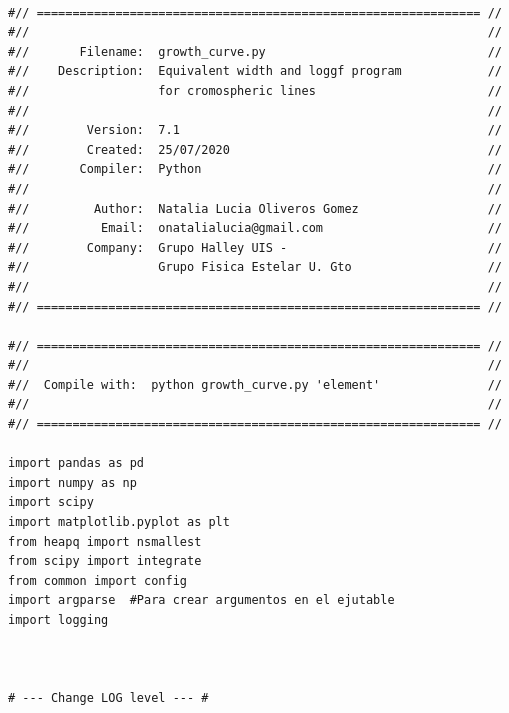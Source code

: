 \documentclass[12pt,oneside,openany,letter]{book}
\begin{document}

\begin{verbatim}

#// ============================================================== //
#//                                                                //
#//       Filename:  growth_curve.py                               //
#//    Description:  Equivalent width and loggf program            //
#//                  for cromospheric lines                        //
#//                                                                //
#//        Version:  7.1                                           //
#//        Created:  25/07/2020                                    //
#//       Compiler:  Python                                        //
#//                                                                //
#//         Author:  Natalia Lucia Oliveros Gomez                  //
#//          Email:  onatalialucia@gmail.com                       //
#//        Company:  Grupo Halley UIS -                            //
#//                  Grupo Fisica Estelar U. Gto                   //
#//                                                                //
#// ============================================================== //

#// ============================================================== //
#//                                                                // 
#//  Compile with:  python growth_curve.py 'element'               //
#//                                                                //
#// ============================================================== //

import pandas as pd
import numpy as np
import scipy
import matplotlib.pyplot as plt
from heapq import nsmallest
from scipy import integrate
from common import config
import argparse  #Para crear argumentos en el ejutable
import logging



# --- Change LOG level --- #


\end{verbatim}
\end{document}
